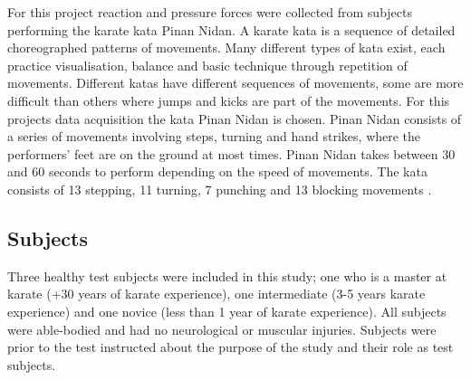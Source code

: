 

For this project reaction and pressure forces were collected from subjects performing the karate kata Pinan Nidan. %
A karate kata is a sequence of detailed choreographed patterns of movements. Many different types of kata exist, each practice visualisation, balance and basic technique through repetition of movements. Different katas have different sequences of movements, some are more difficult than others where jumps and kicks are part of the movements. For this projects data acquisition the kata Pinan Nidan is chosen. 
Pinan Nidan consists of a series of movements involving steps, turning and hand strikes, where the performers' feet are on the ground at most times. Pinan Nidan takes between 30 and 60 seconds to perform depending on the speed of movements. The kata consists of 13 stepping, 11 turning, 7 punching and 13 blocking movements \cite{seikenryu2017}.

\subsection{Subjects} %
Three healthy test subjects were included in this study; one who is a master at karate (+30 years of karate experience), one intermediate (3-5 years karate experience) and one novice (less than 1 year of karate experience). All subjects were able-bodied and had no neurological or muscular injuries. Subjects were prior to the test instructed about the purpose of the study and their role as test subjects.





